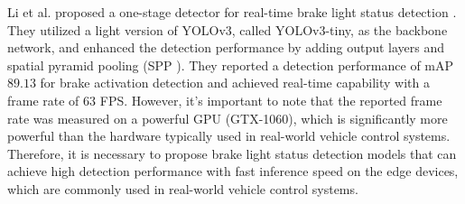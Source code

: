 Li et al. proposed a one-stage detector for real-time brake light status detection \cite{li2020highly}. 
They utilized a light version of YOLOv3, called YOLOv3-tiny, as the backbone network, and enhanced the detection performance by adding output layers and spatial pyramid pooling (SPP \cite{he2015spatial}). 
They reported a detection performance of mAP $89.13$ for brake activation detection and achieved real-time capability with a frame rate of $63$ FPS.
However, it's important to note that the reported frame rate was measured on a powerful GPU (GTX-1060), which is significantly more powerful than the hardware typically used in real-world vehicle control systems. 
Therefore, it is necessary to propose brake light status detection models that can achieve high detection performance with fast inference speed on the edge devices, which are commonly used in real-world vehicle control systems.


